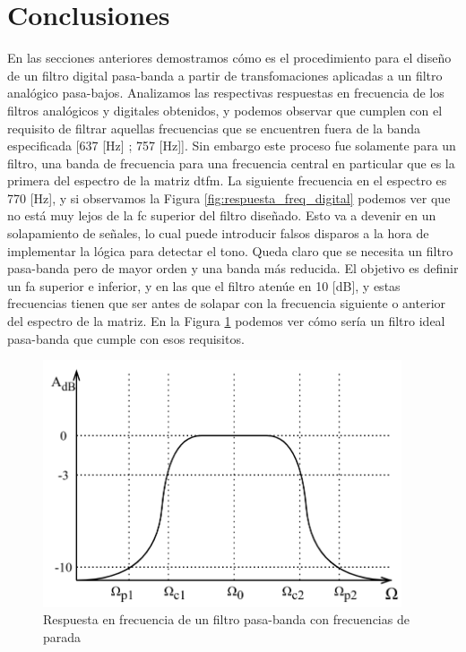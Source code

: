 \section{Conclusiones}
En las secciones anteriores demostramos cómo es el procedimiento para el diseño de un filtro digital pasa-banda a partir de transfomaciones aplicadas a un filtro analógico pasa-bajos. Analizamos las respectivas respuestas en frecuencia de los filtros analógicos y digitales obtenidos, y podemos observar que cumplen con el requisito de filtrar aquellas frecuencias que se encuentren fuera de la banda especificada [637 [Hz] ; 757 [Hz]]. Sin embargo este proceso fue solamente para un filtro, una banda de frecuencia para una frecuencia central en particular que es la primera del espectro de la matriz \gls{dtfm}. La siguiente frecuencia en el espectro es 770 [Hz], y si observamos la Figura \ref{fig:respuesta_freq_digital} podemos ver que no está muy lejos de la \gls{fc} superior del filtro diseñado. Esto va a devenir en un solapamiento de señales, lo cual puede introducir falsos disparos a la hora de implementar la lógica para detectar el tono. Queda claro que se necesita un filtro pasa-banda pero de mayor orden y una banda más reducida. El objetivo es definir un \gls{fa} superior e inferior, y en las que el filtro atenúe en 10 [dB], y estas frecuencias tienen que ser antes de solapar con la frecuencia siguiente o anterior del espectro de la matriz. En la Figura \ref{fig:diagrama_bode_pasa_banda} podemos ver cómo sería un filtro ideal pasa-banda que cumple con esos requisitos.

\begin{figure}[H]
  \centering
  \includegraphics[width=300pt]{images/diagramas-bode-filtro-bp-mejorado.png}
  \caption{Respuesta en frecuencia de un filtro pasa-banda con frecuencias de parada}
  \label{fig:diagrama_bode_pasa_banda}
\end{figure}

